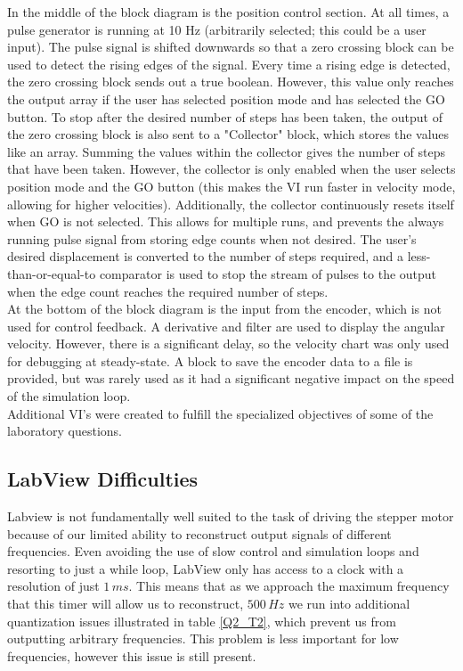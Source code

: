 \documentclass{article}
\theoremstyle{plain}
\theoremstyle{definition}
\theoremstyle{remark}
\begin{document}
In the middle of the block diagram is the position control section. At all times, a pulse generator is running at 10 Hz (arbitrarily selected; this could be a user input). The pulse signal is shifted downwards so that a zero crossing block can be used to detect the rising edges of the signal. Every time a rising edge is detected, the zero crossing block sends out a true boolean. However, this value only reaches the output array if the user has selected position mode and has selected the GO button. To stop after the desired number of steps has been taken, the output of the zero crossing block is also sent to a "Collector" block, which stores the values like an array. Summing the values within the collector gives the number of steps that have been taken. However, the collector is only enabled when the user selects position mode and the GO button (this makes the VI run faster in velocity mode, allowing for higher velocities). Additionally, the collector continuously resets itself when GO is not selected. This allows for multiple runs, and prevents the always running pulse signal from storing edge counts when not desired. The user's desired displacement is converted to the number of steps required, and a less-than-or-equal-to comparator is used to stop the stream of pulses to the output when the edge count reaches the required number of steps.\\

At the bottom of the block diagram is the input from the encoder, which is not used for control feedback. A derivative and filter are used to display the angular velocity. However, there is a significant delay, so the velocity chart was only used for debugging at steady-state. A block to save the encoder data to a file is provided, but was rarely used as it had a significant negative impact on the speed of the simulation loop.   \\


Additional VI's were created to fulfill the specialized objectives of some of the laboratory questions.\\

\subsection*{LabView Difficulties}

Labview is not fundamentally well suited to the task of driving the stepper motor because of our limited ability to reconstruct output signals of different frequencies.  Even avoiding the use of slow control and simulation loops and resorting to just a while loop, LabView only has access to a clock with a resolution of just $1 \, ms$.  This means that as we approach the maximum frequency that this timer will allow us to reconstruct, $500 \, Hz$ we run into additional quantization issues illustrated in table \ref{Q2_T2}, which prevent us from outputting arbitrary frequencies.  This problem is less important for low frequencies, however this issue is still present.  
\end{document}
